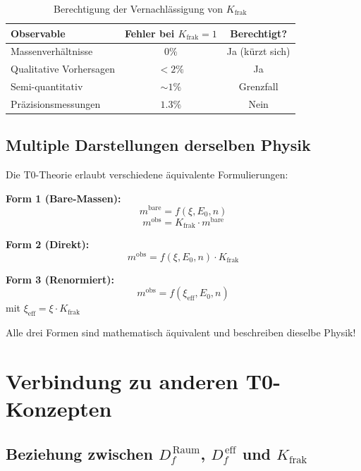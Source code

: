 	\begin{table}[h]
		\centering
		\begin{tabular}{lcc}
			\toprule
			\textbf{Observable} & \textbf{Fehler bei $K_{\text{frak}} = 1$} & \textbf{Berechtigt?} \\
			\midrule
			Massenverhältnisse & $0\%$ & Ja (kürzt sich) \\
			Qualitative Vorhersagen & $< 2\%$ & Ja \\
			Semi-quantitativ & $\sim 1\%$ & Grenzfall \\
			Präzisionsmessungen & $1.3\%$ & Nein \\
			\bottomrule
		\end{tabular}
		\caption{Berechtigung der Vernachlässigung von $K_{\text{frak}}$}
	\end{table}
	
	\subsection{Multiple Darstellungen derselben Physik}
	
	Die T0-Theorie erlaubt verschiedene äquivalente Formulierungen:
	
	\textbf{Form 1 (Bare-Massen):}
	\begin{equation}
		m^{\text{bare}} = f(\xi, E_0, n)
	\end{equation}
	\begin{equation}
		m^{\text{obs}} = K_{\text{frak}} \cdot m^{\text{bare}}
	\end{equation}
	
	\textbf{Form 2 (Direkt):}
	\begin{equation}
		m^{\text{obs}} = f(\xi, E_0, n) \cdot K_{\text{frak}}
	\end{equation}
	
	\textbf{Form 3 (Renormiert):}
	\begin{equation}
		m^{\text{obs}} = f(\xi_{\text{eff}}, E_0, n)
	\end{equation}
	mit $\xi_{\text{eff}} = \xi \cdot K_{\text{frak}}$
	
	Alle drei Formen sind mathematisch äquivalent und beschreiben dieselbe Physik!
	
	\section{Verbindung zu anderen T0-Konzepten}
	
	\subsection{Beziehung zwischen $D_f^{\,\text{Raum}}$, $D_f^{\,\text{eff}}$ und $K_{\text{frak}}$}
	
